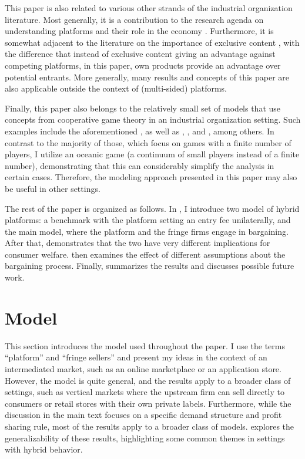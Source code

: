 This paper is also related to various other strands of the industrial organization literature.
Most generally, it is a contribution to the research agenda on understanding platforms and their role in the economy \parencite[e.g.][]{rochet2003platform,hagiu2004optimal,armstrong2006competition,evans2011platform,lee2014competing}.
Furthermore, it is somewhat adjacent to the literature on the importance of exclusive content \parencite[e.g.][]{hagiu2011exclusivity,lee2013vertical,dou2014sell,weeds2016tv}, with the difference that instead of exclusive content giving an advantage against competing platforms, in this paper, own products provide an advantage over potential entrants.
More generally, many results and concepts of this paper are also applicable outside the context of (multi-sided) platforms.

Finally, this paper also belongs to the relatively small set of models that use concepts from cooperative game theory in an industrial organization setting.
Such examples include the aforementioned \textcite{montez2007downstream}, as well as \textcite{hart1990property}, \textcite{levy1997individual}, \textcite{inderst2003bargaining} and \textcite{brugemann2019intra}, among others.
In contrast to the majority of those, which focus on games with a finite number of players, I utilize an oceanic game (a continuum of small players instead of a finite number), demonstrating that this can considerably simplify the analysis in certain cases.
Therefore, the modeling approach presented in this paper may also be useful in other settings.

The rest of the paper is organized as follows.
In , I introduce two model of hybrid platforms: a benchmark with the platform setting an entry fee unilaterally, and the main model, where the platform and the fringe firms engage in bargaining.
After that,  demonstrates that the two have very different implications for consumer welfare.
 then examines the effect of different assumptions about the bargaining process.
Finally,  summarizes the results and discusses possible future work.


\section{Model}
\label{sec:model}

This section introduces the model used throughout the paper.
I use the terms ``platform'' and ``fringe sellers'' and present my ideas in the context of an intermediated market, such as an online marketplace or an application store.
However, the model is quite general, and the results apply to a broader class of settings, such as vertical markets where the upstream firm can sell directly to consumers or retail stores with their own private labels.
Furthermore, while the discussion in the main text focuses on a specific demand structure and profit sharing rule, most of the results apply to a broader class of models.
 explores the generalizability of these results, highlighting some common themes in settings with hybrid behavior.

